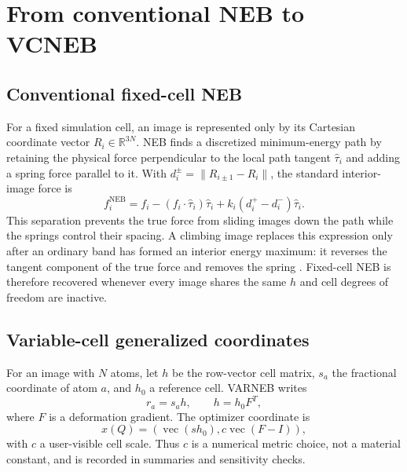 \documentclass[final,5p,times,twocolumn]{elsarticle}
\begin{document}
\section{From conventional NEB to VCNEB}
\label{sec:method}

\subsection{Conventional fixed-cell NEB}

For a fixed simulation cell, an image is represented only by its Cartesian
coordinate vector $R_i\in\mathbb{R}^{3N}$.  NEB finds a discretized
minimum-energy path by retaining the physical force perpendicular to the local
path tangent $\hat\tau_i$ and adding a spring force parallel to it.  With
$d_i^{\pm}=\lVert R_{i\pm1}-R_i\rVert$, the standard interior-image force is
\begin{equation}
 f_i^{\mathrm{NEB}}=
 f_i-(f_i\cdot\hat\tau_i)\hat\tau_i+
 k_i(d_i^+-d_i^-)\hat\tau_i .
 \label{eq:fixed-neb}
\end{equation}
This separation prevents the true force from sliding images down the path while
the springs control their spacing.  A climbing image replaces this expression
only after an ordinary band has formed an interior energy maximum: it reverses
the tangent component of the true force and removes the spring
\cite{Henkelman2000}.  Fixed-cell NEB is therefore recovered whenever every
image shares the same $h$ and cell degrees of freedom are inactive.

\subsection{Variable-cell generalized coordinates}

For an image with $N$ atoms, let $h$ be the row-vector cell matrix, $s_a$ the
fractional coordinate of atom $a$, and $h_0$ a reference cell. VARNEB writes
\begin{equation}
 r_a=s_a h,\qquad h=h_0F^T,
\end{equation}
where $F$ is a deformation gradient. The optimizer coordinate is
\begin{equation}
 x(Q)=\left(\operatorname{vec}(s h_0),c\operatorname{vec}(F-I)\right),
 \label{eq:coordinate}
\end{equation}
with $c$ a user-visible cell scale. Thus $c$ is a numerical metric choice, not
a material constant, and is recorded in summaries and sensitivity checks.
\end{document}
